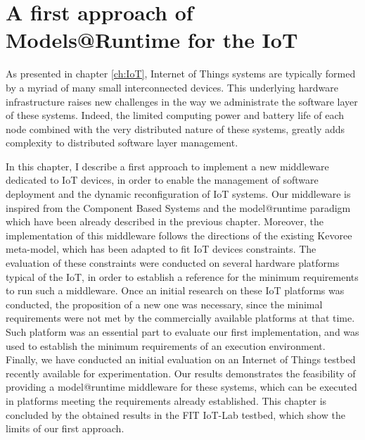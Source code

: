 \chapter{A first approach of Models@Runtime for the IoT}
\label{ch:MARContiki}
As presented in chapter \ref{ch:IoT}, Internet of Things systems are typically formed by a myriad of many small interconnected devices.
This underlying hardware infrastructure raises new challenges in the way we administrate the software layer of these systems.
Indeed, the limited computing power and battery life of each node combined with the very distributed nature of these systems, greatly adds complexity to distributed software layer management.

In this chapter, I describe a first approach to implement a new middleware dedicated to IoT devices, in order to enable the management of software deployment and the dynamic reconfiguration of IoT systems.
Our middleware is inspired from the Component Based Systems and the model@runtime paradigm which have been already described in the previous chapter.
Moreover, the implementation of this middleware follows the directions of the existing Kevoree meta-model\todo{\cite{}}, which has been adapted to fit IoT devices constraints. 
The evaluation of these constraints were conducted on several hardware platforms typical of the IoT, in order to establish a reference for the minimum requirements to run such a middleware.
Once an initial research on these IoT platforms was conducted, the proposition of a new one was necessary, since the minimal requirements were not met by the commercially available platforms at that time.
Such platform was an essential part to evaluate our first implementation, and was used to establish the minimum requirements of an execution environment.
Finally, we have conducted an initial evaluation on an Internet of Things testbed\cite{Fleury15iotlab} recently available for experimentation.
Our results demonstrates the feasibility of providing a model@runtime middleware for these systems, which can be executed in platforms meeting the requirements already established.
This chapter is concluded by the obtained results in the FIT IoT-Lab testbed, which show the limits of our first approach.

